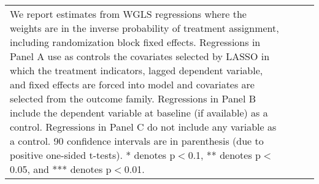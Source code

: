 \begin{table}[H]
\begin{tabular}{@{\extracolsep{0pt}}lccc}
{{  We report estimates from WGLS regressions where the weights are in the inverse probability of treatment 
  assignment, including randomization block fixed effects. 
  Regressions in Panel A use as controls the covariates selected by LASSO in which the treatment indicators,
  lagged dependent variable, and fixed effects are forced into model and covariates are selected from the outcome family.
  Regressions in Panel B include the dependent variable at baseline (if available) as a control. 
  Regressions in Panel C do not include any variable as a control. 
  90\4 confidence intervals are in parenthesis (due to positive one-sided t-tests). 
  * denotes p$<$0.1, ** denotes p$<$0.05, and *** denotes p$<$0.01.}} \\\end{tabular} \end{table} 